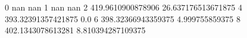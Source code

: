 0 nan nan
1 nan nan
2 419.9610900878906 26.637176513671875
4 393.32391357421875 0.0
6 398.32366943359375 4.999755859375
8 402.1343078613281 8.810394287109375
